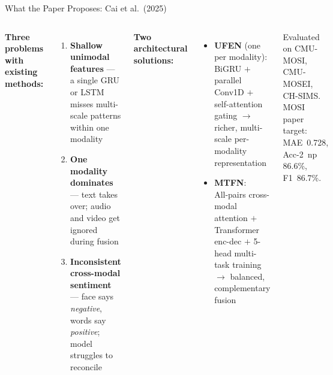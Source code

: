 \documentclass[aspectratio=169,10pt]{beamer}
\begin{document}
\begin{frame}{What the Paper Proposes: Cai et al.\ (2025)}
  \begin{columns}[t]
    \textbf{Three problems with existing methods:}
    \vspace{0.3em}
    \begin{enumerate}\small
      \item \textbf{Shallow unimodal features} --- a single GRU or LSTM misses multi-scale patterns within one modality
      \vspace{0.2em}
      \item \textbf{One modality dominates} --- text takes over; audio and video get ignored during fusion
      \vspace{0.2em}
      \item \textbf{Inconsistent cross-modal sentiment} --- face says \emph{negative}, words say \emph{positive}; model struggles to reconcile
    \end{enumerate}
    \textbf{Two architectural solutions:}
    \vspace{0.3em}
    \begin{itemize}\small
      \item \textbf{UFEN} (one per modality):\\[2pt]
        BiGRU $+$ parallel Conv1D $+$ self-attention gating $\to$ richer, multi-scale per-modality representation
      \vspace{0.3em}
      \item \textbf{MTFN}:\\[2pt]
        All-pairs cross-modal attention $+$ Transformer enc-dec $+$ 5-head multi-task training $\to$ balanced, complementary fusion
    \end{itemize}
    \vspace{0.4em}
    \footnotesize Evaluated on CMU-MOSI, CMU-MOSEI, CH-SIMS.\\
    MOSI paper target: MAE~0.728, Acc-2~np 86.6\%, F1~86.7\%.
  \end{columns}
\end{frame}
\end{document}

